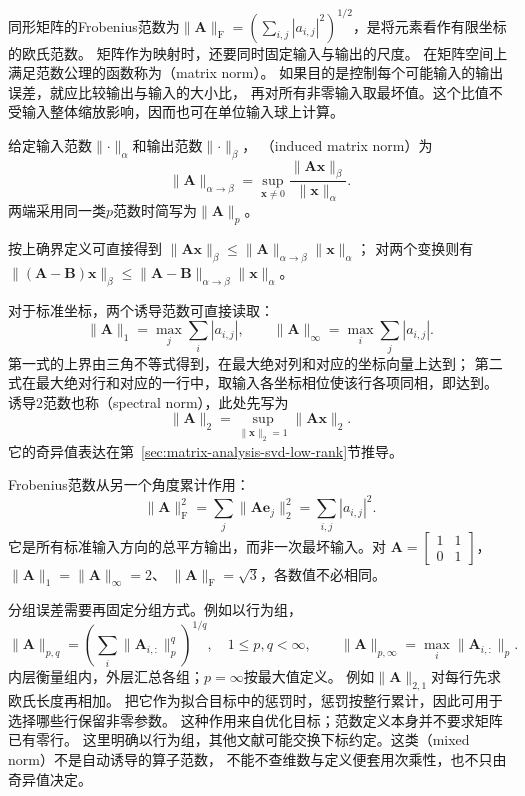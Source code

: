 同形矩阵的Frobenius范数为$\lVert\bm A\rVert_{\mathrm F}
=(\sum_{i,j}|a_{i,j}|^2)^{1/2}$，是将元素看作有限坐标的欧氏范数。
矩阵作为映射时，还要同时固定输入与输出的尺度。
在矩阵空间上满足范数公理的函数称为（matrix norm）。
如果目的是控制每个可能输入的输出误差，就应比较输出与输入的大小比，
再对所有非零输入取最坏值。这个比值不受输入整体缩放影响，因而也可在单位输入球上计算。
\begin{definition}[由向量范数诱导的矩阵范数]
\label{def:matrix-analysis-induced-norm}
给定输入范数$\lVert\cdot\rVert_\alpha$和输出范数$\lVert\cdot\rVert_\beta$，
（induced matrix norm）为
\[
 \lVert\bm A\rVert_{\alpha\to\beta}
 =\sup_{\bm x\neq0}\frac{\lVert\bm A\bm x\rVert_\beta}
                         {\lVert\bm x\rVert_\alpha}.
\]
两端采用同一类$p$范数时简写为$\lVert\bm A\rVert_p$。
\end{definition}
按上确界定义可直接得到
$\lVert\bm A\bm x\rVert_\beta\leq
\lVert\bm A\rVert_{\alpha\to\beta}\lVert\bm x\rVert_\alpha$；
对两个变换则有
$\lVert(\bm A-\bm B)\bm x\rVert_\beta\leq
\lVert\bm A-\bm B\rVert_{\alpha\to\beta}\lVert\bm x\rVert_\alpha$。

对于标准坐标，两个诱导范数可直接读取：
\[
 \lVert\bm A\rVert_1=\max_j\sum_i|a_{i,j}|,\qquad
 \lVert\bm A\rVert_\infty=\max_i\sum_j|a_{i,j}|.
\]
第一式的上界由三角不等式得到，在最大绝对列和对应的坐标向量上达到；
第二式在最大绝对行和对应的一行中，取输入各坐标相位使该行各项同相，即达到。
诱导$2$范数也称（spectral norm），此处先写为
\[
 \lVert\bm A\rVert_2
 =\sup_{\lVert\bm x\rVert_2=1}\lVert\bm A\bm x\rVert_2.
\]
它的奇异值表达在第~\ref{sec:matrix-analysis-svd-low-rank}节推导。

Frobenius范数从另一个角度累计作用：
\[
 \lVert\bm A\rVert_{\mathrm F}^2
 =\sum_j\lVert\bm A\bm e_j\rVert_2^2
 =\sum_{i,j}|a_{i,j}|^2.
\]
它是所有标准输入方向的总平方输出，而非一次最坏输入。对
$\bm A=\left[\begin{smallmatrix}1&1\\0&1\end{smallmatrix}\right]$，
$\lVert\bm A\rVert_1=\lVert\bm A\rVert_\infty=2$、
$\lVert\bm A\rVert_{\mathrm F}=\sqrt3$，各数值不必相同。


分组误差需要再固定分组方式。例如以行为组，
\[
 \lVert\bm A\rVert_{p,q}
 =\left(\sum_i\lVert\bm A_{i,:}\rVert_p^q\right)^{1/q},
 \quad 1\leq p,q<\infty,
 \qquad
 \lVert\bm A\rVert_{p,\infty}=\max_i\lVert\bm A_{i,:}\rVert_p.
\]
内层衡量组内，外层汇总各组；$p=\infty$按最大值定义。
例如$\lVert\bm A\rVert_{2,1}$对每行先求欧氏长度再相加。
把它作为拟合目标中的惩罚时，惩罚按整行累计，因此可用于选择哪些行保留非零参数。
这种作用来自优化目标；范数定义本身并不要求矩阵已有零行。
这里明确以行为组，其他文献可能交换下标约定。这类（mixed norm）不是自动诱导的算子范数，
不能不查维数与定义便套用次乘性，也不只由奇异值决定。


